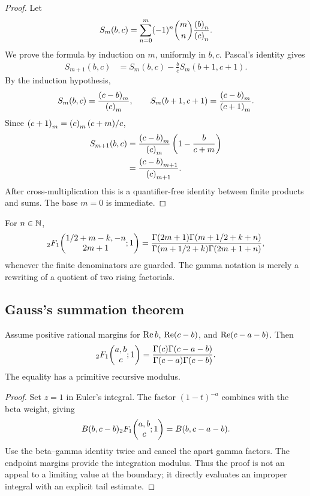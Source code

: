 \begin{proof}
Let
\[
 S_m(b,c)=\sum_{n=0}^m(-1)^n\binom mn\frac{\left(b\right)_{n}}{\left(c\right)_{n}}.
\]
We prove the formula by induction on \(m\), uniformly in \(b,c\).  Pascal's
identity gives
\begin{align*}
 S_{m+1}(b,c)
 &=S_m(b,c)-\frac bc S_m(b+1,c+1).
\end{align*}
By the induction hypothesis,
\[
 S_m(b,c)=\frac{\left(c-b\right)_{m}}{\left(c\right)_{m}},
 \qquad
 S_m(b+1,c+1)=\frac{\left(c-b\right)_{m}}{\left(c+1\right)_{m}}.
\]
Since
\(\left(c+1\right)_{m}=\left(c\right)_{m}(c+m)/c\),
\begin{align*}
 S_{m+1}(b,c)
 &=\frac{\left(c-b\right)_{m}}{\left(c\right)_{m}}
   \left(1-\frac b{c+m}\right)\\
 &=\frac{\left(c-b\right)_{m+1}}{\left(c\right)_{m+1}}.
\end{align*}
After cross-multiplication this is a quantifier-free identity between finite
products and sums.  The base \(m=0\) is immediate.
\end{proof}

\begin{corollary}
For \(n\in\mathbb N\),
\[
 {}_2F_1\!\left(\begin{matrix}1/2+m-k,-n\\2m+1\end{matrix};1\right)
 =\frac{\Gamma(2m+1)\Gamma(m+1/2+k+n)}
        {\Gamma(m+1/2+k)\Gamma(2m+1+n)},
\]
whenever the finite denominators are guarded.  The gamma notation is merely a
rewriting of a quotient of two rising factorials.
\end{corollary}

\subsection{Gauss's summation theorem}

\begin{theorem}\label{thm:gauss}
Assume positive rational margins for
\(\operatorname{Re} b\), \(\operatorname{Re}(c-b)\), and
\(\operatorname{Re}(c-a-b)\).  Then
\begin{equation}\label{eq:gauss}
 {}_2F_1\!\left(\begin{matrix}a,b\\c\end{matrix};1\right)
 =\frac{\Gamma(c)\Gamma(c-a-b)}
        {\Gamma(c-a)\Gamma(c-b)}.
\end{equation}
The equality has a primitive recursive modulus.
\end{theorem}

\begin{proof}
Set \(z=1\) in Euler's integral.  The factor
\((1-t)^{-a}\) combines with the beta weight, giving
\[
 B(b,c-b){}_2F_1\!\left(\begin{matrix}a,b\\c\end{matrix};1\right)=B(b,c-a-b).
\]
Use the beta--gamma identity twice and cancel the apart gamma factors.  The
endpoint margins provide the integration modulus.  Thus the proof is not an
appeal to a limiting value at the boundary; it directly evaluates an
improper integral with an explicit tail estimate.
\end{proof}

